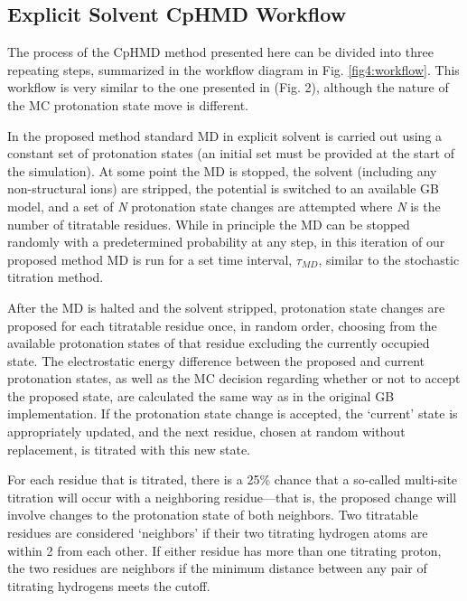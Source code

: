 \subsection{Explicit Solvent CpHMD Workflow}

The process of the CpHMD method presented here can be divided into three
repeating steps, summarized in the workflow diagram in Fig. \ref{fig4:workflow}.
This workflow is very similar to the one presented in
\citeauthor{Baptista_JChemPhys_2002_v117_p4184} (Fig. 2),
\cite{Baptista_JChemPhys_2002_v117_p4184} although the nature of the MC
protonation state move is different.

In the proposed method standard MD in explicit solvent is carried out using a
constant set of protonation states (an initial set must be provided at the start
of the simulation). At some point the MD is stopped, the solvent (including any
non-structural ions) are stripped, the potential is switched to an available GB
model, and a set of \emph{N} protonation state changes are attempted where
\emph{N} is the number of titratable residues. While in principle the MD can
be stopped randomly with a predetermined probability at any step, in this
iteration of our proposed method MD is run for a set time interval, $\tau_{MD}$,
similar to the stochastic titration method.
\cite{Baptista_JChemPhys_2002_v117_p4184}

After the MD is halted and the solvent stripped, protonation state changes are
proposed for each titratable residue once, in random order, choosing from the
available protonation states of that residue excluding the currently occupied
state. The electrostatic energy difference between the proposed and current
protonation states, as well as the MC decision regarding whether or not to
accept the proposed state, are calculated the same way as in the original GB
implementation. \cite{Mongan_JComputChem_2004_v25_p2038} If the protonation
state change is accepted, the `current' state is appropriately updated, and the
next residue, chosen at random without replacement, is titrated with this new
state.

For each residue that is titrated, there is a 25\% chance that a so-called
multi-site titration will occur with a neighboring residue---that is, the
proposed change will involve changes to the protonation state of both neighbors.
Two titratable residues are considered `neighbors' if their two titrating
hydrogen atoms are within 2 \text{\AA} from each other. If either residue has
more than one titrating proton, the two residues are neighbors if the minimum
distance between any pair of titrating hydrogens meets the cutoff.

